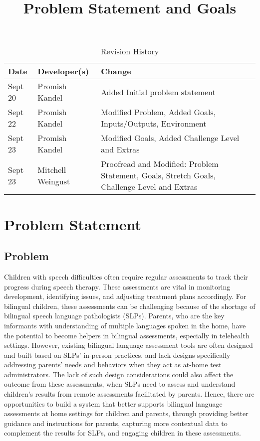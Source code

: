 \documentclass{article}
\title{Problem Statement and Goals\\\progname}
\author{\authname}
\date{}
\begin{document}
\maketitle

\begin{table}[hp]
\caption{Revision History} \label{TblRevisionHistory}
\begin{tabularx}{\textwidth}{llX}
\toprule
\textbf{Date} & \textbf{Developer(s)} & \textbf{Change}\\
\midrule
Sept 20 & Promish Kandel& Added Initial problem statement\\
Sept 22 & Promish Kandel & Modified Problem, Added Goals, Inputs/Outputs, Environment\\
Sept 23 & Promish Kandel & Modified Goals, Added Challenge Level and Extras\\
Sept 23 & Mitchell Weingust & Proofread and Modified: Problem Statement, Goals, Stretch Goals, Challenge Level and Extras\\
\bottomrule
\end{tabularx}
\end{table}

\section{Problem Statement}


\subsection{Problem}
\hspace{2em}Children with speech difficulties often require regular assessments to track their progress
during speech therapy. These assessments are vital in monitoring development, identifying issues, and
adjusting treatment plans accordingly. For bilingual children, these assessments can be challenging
because of the shortage of bilingual  speech language pathologists (SLPs).  Parents, who are the key
informants with understanding of multiple languages spoken in the home, have the potential to become
helpers in bilingual assessments, especially in telehealth settings. However, existing bilingual language
assessment tools are often designed and built based on SLPs’ in-person practices, and lack designs
specifically addressing parents’ needs and behaviors when they act as at-home test administrators. The lack of such design
considerations could also affect the outcome from these assessments, when SLPs need to assess and understand
children’s results from remote assessments facilitated by parents. Hence, there are opportunities to build a
system that better supports bilingual language assessments at home settings for children and parents, through
providing better guidance and instructions for parents, capturing more contextual data to complement the
results for SLPs, and engaging children in these assessments.
\end{document}

